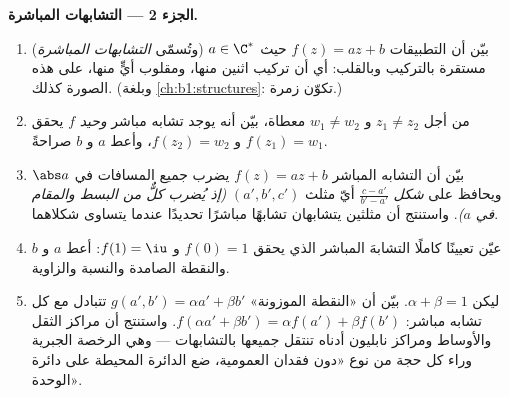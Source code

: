 \begin{problem}
\medskip
\noindent\textbf{الجزء 2 --- التشابهات المباشرة.}
\begin{enumerate}[resume]
  \item بيّن أن التطبيقات $f(z) = az + b$ حيث $a \in \C^*$
        (وتُسمّى \emph{التشابهات المباشرة}) مستقرة بالتركيب
        وبالقلب: أي أن تركيب اثنين منها، ومقلوب أيٍّ منها،
        على هذه الصورة كذلك. (وبلغة
        \cref{ch:b1:structures}: تكوّن زمرة.)
  \item من أجل $z_1 \neq z_2$ و $w_1 \neq w_2$ معطاة، بيّن أنه يوجد
        تشابه مباشر \emph{وحيد} $f$ يحقق $f(z_1) = w_1$ و
        $f(z_2) = w_2$، وأعط $a$ و $b$ صراحةً.
  \item بيّن أن التشابه المباشر $f(z) = az + b$ يضرب
        جميع المسافات في $\abs a$ ويحافظ على \emph{شكل}
        $\frac{c - a'}{b' - a'}$ أيّ مثلث $(a', b', c')$
        \emph{(إذ يُضرب كلٌّ من البسط والمقام في
        $a$)}. واستنتج أن مثلثين يتشابهان تشابهًا مباشرًا
        تحديدًا عندما يتساوى شكلاهما.
  \item عيّن تعيينًا كاملًا التشابهَ المباشر الذي يحقق $f(0) = 1$
        و $f(1) = \iu$: أعط $a$ و $b$ والنقطة الصامدة والنسبة
        والزاوية.
  \item ليكن $\alpha + \beta = 1$. بيّن أن «النقطة الموزونة»
        $g(a', b') = \alpha a' + \beta b'$ تتبادل مع كل
        تشابه مباشر: $f(\alpha a' + \beta b') = \alpha f(a')
        + \beta f(b')$. واستنتج أن مراكز الثقل والأوساط ومراكز
        نابليون أدناه تنتقل جميعها بالتشابهات
        --- وهي الرخصة الجبرية وراء كل حجة من نوع «دون فقدان
        العمومية، ضع الدائرة المحيطة على دائرة الوحدة».
\end{enumerate}


\end{problem}
